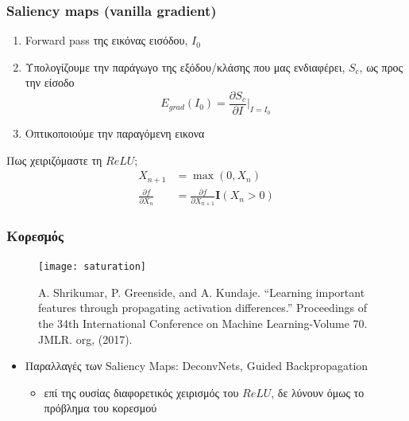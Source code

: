 \begin{frame}
  \frametitle{Saliency maps (vanilla gradient)}
  \begin{enumerate}
  \item Forward pass της εικόνας εισόδου, $I_0$
  \item Υπολογίζουμε την παράγωγο της εξόδου/κλάσης που μας ενδιαφέρει, $S_c$, ως
    προς την είσοδο
    \begin{equation*}
      E_{grad}(I_0) = \frac{\partial S_c}{\partial I}\Bigr|_{I=I_0}
    \end{equation*}
  \item Οπτικοποιούμε την παραγόμενη εικονα
  \end{enumerate}
  Πως χειριζόμαστε τη $ReLU$;
  \begin{align*}
    X_{n+1} &= \max(0, X_n)\\
    \frac{\partial f}{\partial X_n} &= \frac{\partial f}{\partial X_{n+1}}\mathbf{I}(X_n > 0)
  \end{align*}
\end{frame}

\begin{frame}
  \frametitle{Κορεσμός}
  \begin{figure}
    \texttt{[image: saturation]}
    \caption{\footnotesize A. Shrikumar, P. Greenside, and A.
      Kundaje. ``Learning important features through propagating activation
      differences.'' Proceedings of the 34th International Conference on
      Machine Learning-Volume 70. JMLR. org, (2017).}
  \end{figure}
  \begin{itemize}
  \item Παραλλαγές των Saliency Maps: DeconvNets, Guided Backpropagation
    \begin{itemize}
    \item επί της ουσίας διαφορετικός χειρισμός του $ReLU$, δε λύνουν όμως το
      πρόβλημα του κορεσμού
    \end{itemize}
  \end{itemize}
\end{frame}

